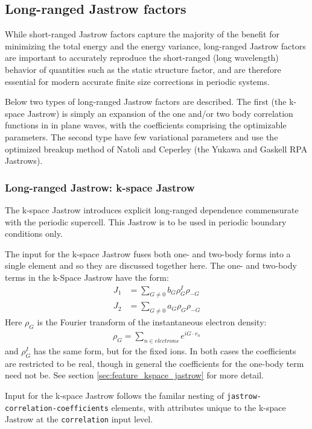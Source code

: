 \subsection{Long-ranged Jastrow factors}
While short-ranged Jastrow factors capture the majority of the benefit 
for minimizing the total energy and the energy variance, long-ranged 
Jastrow factors are important to accurately reproduce the short-ranged 
(long wavelength) behavior of quantities such as the static structure 
factor, and are therefore essential for modern accurate finite size 
corrections in periodic systems.

Below two types of long-ranged Jastrow factors are described.  The 
first (the k-space Jastrow) is simply an expansion of the one and/or 
two body correlation functions in in plane waves, with the coefficients 
comprising the optimizable parameters.  The second type have few 
variational parameters and use the optimized breakup method of Natoli 
and Ceperley\cite{Natoli1995} (the Yukawa and Gaskell RPA Jastrows).


\subsubsection{Long-ranged Jastrow: k-space Jastrow}
The k-space Jastrow introduces explicit long-ranged dependence commensurate with the periodic supercell.  This Jastrow is to be used in periodic boundary conditions only.  

The input for the k-space Jastrow fuses both one- and two-body forms into a single element and so they are discussed together here.  The one- and two-body terms in the k-Space Jastrow have the form:
\begin{align}
  J_1 &= \sum_{G\ne 0}b_G\rho_G^I\rho_{-G} \\
  J_2 &= \sum_{G\ne 0}a_G\rho_G\rho_{-G}
\end{align}
Here $\rho_G$ is the Fourier transform of the instantaneous electron density:
\begin{align}
  \rho_G=\sum_{n\in electrons}e^{iG\cdot r_n}
\end{align}
and $\rho_G^I$ has the same form, but for the fixed ions. In both cases the coefficients are restricted to be real, though in general the coefficients for the one-body term need not be.  See section \ref{sec:feature_kspace_jastrow} for more detail.

Input for the k-space Jastrow follows the familar nesting of \texttt{jastrow-correlation-coefficients} elements, with attributes unique to the k-space Jastrow at the \texttt{correlation} input level.

